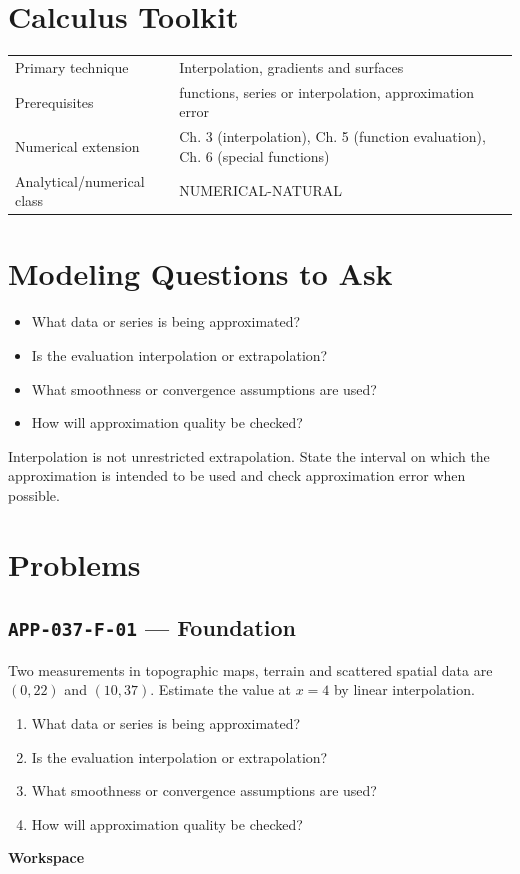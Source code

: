 \documentclass[11pt]{book}
\newcommand{\pid}[1]{\texttt{#1}}
\newcommand{\workspace}{\par\vspace{0.7in}\hrulefill\par\vspace{0.55in}\hrulefill\par}
\begin{document}
\section*{Calculus Toolkit}
\begin{tabularx}{\textwidth}{@{}lX@{}}\toprule
Primary technique & Interpolation, gradients and surfaces \\
Prerequisites & functions, series or interpolation, approximation error \\
Numerical extension & Ch. 3 (interpolation), Ch. 5 (function evaluation), Ch. 6 (special functions) \\
Analytical/numerical class & NUMERICAL-NATURAL \\
\bottomrule\end{tabularx}
\section*{Modeling Questions to Ask}\begin{itemize}
\item What data or series is being approximated?
\item Is the evaluation interpolation or extrapolation?
\item What smoothness or convergence assumptions are used?
\item How will approximation quality be checked?
\end{itemize}
\begin{errorbox}Interpolation is not unrestricted extrapolation. State the interval on which the approximation is intended to be used and check approximation error when possible.\end{errorbox}
\section*{Problems}
\subsection*{\pid{APP-037-F-01} — Foundation}
\begin{problembox}
Two measurements in topographic maps, terrain and scattered spatial data are $(0,22)$ and $(10,37)$. Estimate the value at $x=4$ by linear interpolation.
\end{problembox}
\begin{promptbox}\begin{enumerate}
\item What data or series is being approximated?
\item Is the evaluation interpolation or extrapolation?
\item What smoothness or convergence assumptions are used?
\item How will approximation quality be checked?
\end{enumerate}\end{promptbox}
\textbf{Workspace}\workspace
{}
\end{document}

